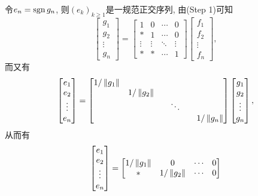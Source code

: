 \begin{Proof}
	令$ e_n=\mathrm{sgn}\, g_n $, 则$ (e_k)_{k\geqslant 1} $是一规范正交序列, 由(Step 1)可知
	\[
		\begin{bmatrix}
			g_1 \\g_2\\\vdots\\g_n
		\end{bmatrix}=\begin{bmatrix}
			1 & 0 & \cdots & 0 \\ \ast & 1 & \cdots & 0 \\ \vdots & \vdots & \ddots & \vdots\\ \ast & \ast & \cdots & 1
		\end{bmatrix}\begin{bmatrix}
			f_1 \\ f_2\\\vdots\\f_n
		\end{bmatrix},
	\]
	而又有
	\[
		\begin{bmatrix}
			e_1 \\e_2\\\vdots\\e_n
		\end{bmatrix}=\begin{bmatrix}
			1/\norm{g_1}           & \phantom{1/\norm{g_1}} & \phantom{1/\norm{g_1}} & \phantom{1/\norm{g_1}} \\
			\phantom{1/\norm{g_1}} & 1/\norm{g_2}           & \phantom{1/\norm{g_1}} & \phantom{1/\norm{g_1}} \\
			\phantom{1/\norm{g_1}} & \phantom{1/\norm{g_1}} & \ddots                 & \phantom{1/\norm{g_1}} \\
			\phantom{1/\norm{g_1}} & \phantom{1/\norm{g_1}} & \phantom{1/\norm{g_1}} & 1/\norm{g_n}
		\end{bmatrix}\begin{bmatrix}
			g_1 \\g_2\\\vdots\\g_n
		\end{bmatrix},
	\]
	从而有
	\[
		\begin{bmatrix}
			e_1 \\e_2\\\vdots\\e_n
		\end{bmatrix}=\begin{bmatrix}
			1/\left\| g_1 \right\| & 0            & \cdots & 0            \\
			\ast         & 1/\left\| g_2 \right\| & \cdots & 0            \\

\end{bmatrix}\]
\end{Proof}
